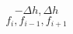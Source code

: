 \begin{equation} 
- {\Delta h} , {\Delta h}
 \end{equation} 
\begin{equation} 
f_{i} , f_{{i-1}} , f_{{i+1}}
 \end{equation}
